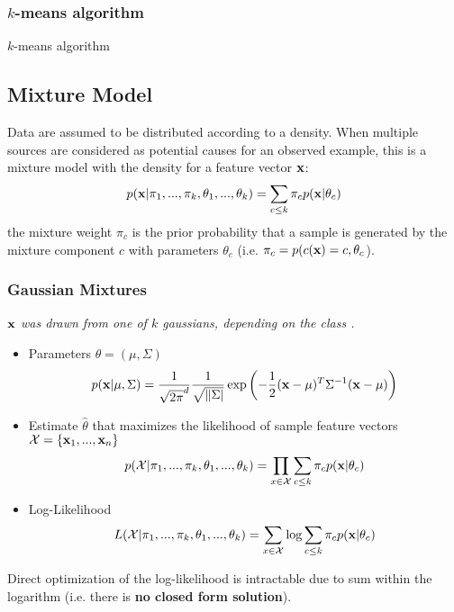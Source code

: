 \subsubsection{$k$-means algorithm}

\begin{algorithm}[H]  


  \caption{$k$-means algorithm}
\end{algorithm}

\subsection{Mixture Model}
Data are assumed to be distributed according to a density. When multiple sources are considered as potential causes for an observed example, this is a mixture model with the density for a feature vector $\mathbf x$:
$$
	p(\mathbf x|\pi_1, ..., \pi_k, \theta_1, ..., \theta_k) = \sum_{c\leq k} \pi_c p(\mathbf x|\theta_c)
$$
the mixture weight $\pi_c$ is the prior probability that a sample is generated by the mixture component $c$ with parameters $\theta_c$ (i.e. $\pi_c = p(c(\mathbf x) = c, \theta_c$).

\subsubsection{Gaussian Mixtures}
\textit{$\mathbf x$ was drawn from one of $k$ gaussians, depending on the class .}
\begin{itemize}
	\item Parameters $\theta = (\mu, \Sigma)$
	$$
		p(\mathbf x|\mu,\Sigma) = \frac{1}{\sqrt{2\pi}^d}\frac{1}{\sqrt{\|\Sigma|}}\exp\left(-\frac{1}{2}(\mathbf x - \mu)^T\Sigma^{-1}(\mathbf x - \mu) \right)
	$$
	\item Estimate $\hat\theta$ that maximizes the likelihood of sample feature vectors $\mathcal X = \{\mathbf x_1, ..., \mathbf x_n\}$
	$$
			p(\mathcal X|\pi_1, ..., \pi_k, \theta_1, ..., \theta_k) = \prod_{x\in \mathcal X}\sum_{c\leq k} \pi_c p(\mathbf x|\theta_c)
	$$
	\item Log-Likelihood 
	$$
	L(\mathcal X|\pi_1, ..., \pi_k, \theta_1, ..., \theta_k) = \sum_{x\in \mathcal X}\log \sum_{c\leq k}\pi_cp(\mathbf x|\theta_c)
	$$
\end{itemize}
Direct optimization of the log-likelihood is intractable due to sum within the logarithm (i.e. there is \textbf{no closed form solution}). 

